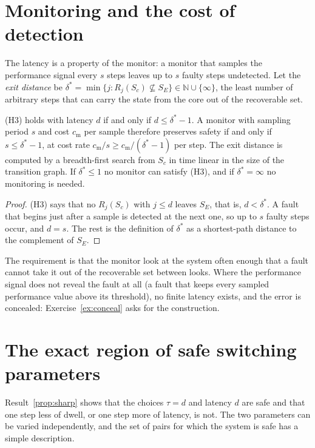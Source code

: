 \section{Monitoring and the cost of detection}

The latency is a property of the monitor: a monitor that samples the performance signal every $s$ steps leaves up to $s$ faulty steps undetected. Let the \emph{exit distance} be $\delta^{*}=\min\{j:R_j(S_c)\not\subseteq S_E\}\in\mathbb N\cup\{\infty\}$, the least number of arbitrary steps that can carry the state from the core out of the recoverable set.

\begin{newresult}\label{prop:latency}
(H3) holds with latency $d$ if and only if $d\le\delta^{*}-1$. A monitor with sampling period $s$ and cost $c_{\mathrm m}$ per sample therefore preserves safety if and only if $s\le\delta^{*}-1$, at cost rate $c_{\mathrm m}/s\ge c_{\mathrm m}/(\delta^{*}-1)$ per step. The exit distance is computed by a breadth-first search from $S_c$ in time linear in the size of the transition graph. If $\delta^{*}\le1$ no monitor can satisfy (H3), and if $\delta^{*}=\infty$ no monitoring is needed.
\end{newresult}
\begin{proof}
(H3) says that no $R_j(S_c)$ with $j\le d$ leaves $S_E$, that is, $d<\delta^{*}$. A fault that begins just after a sample is detected at the next one, so up to $s$ faulty steps occur, and $d=s$. The rest is the definition of $\delta^{*}$ as a shortest-path distance to the complement of $S_E$.
\end{proof}

The requirement is that the monitor look at the system often enough that a fault cannot take it out of the recoverable set between looks. Where the performance signal does not reveal the fault at all (a fault that keeps every sampled performance value above its threshold), no finite latency exists, and the error is concealed: Exercise~\ref{ex:conceal} asks for the construction.


\section{The exact region of safe switching parameters}\label{sec:safe-region}

Result~\ref{prop:sharp} shows that the choices $\tau=d$ and latency $d$ are safe and that one step less of dwell, or one step more of latency, is not. The two parameters can be varied independently, and the set of pairs for which the system is safe has a simple description.

